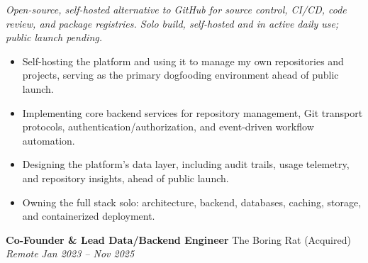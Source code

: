 \documentclass[10.5pt,letterpaper]{article}
\newcommand{\role}[4]{%
  \textbf{#1} \hfill #2 \\
  \textit{#3} \hfill \textit{#4}%
}
\begin{document}
\textit{Open-source, self-hosted alternative to GitHub for source control, CI/CD, code review, and package registries. Solo build, self-hosted and in active daily use; public launch pending.}
\begin{itemize}
  \item Self-hosting the platform and using it to manage my own repositories and projects, serving as the primary dogfooding environment ahead of public launch.
  \item Implementing core backend services for repository management, Git transport protocols, authentication/authorization, and event-driven workflow automation.
  \item Designing the platform's data layer, including audit trails, usage telemetry, and repository insights, ahead of public launch.
  \item Owning the full stack solo: architecture, backend, databases, caching, storage, and containerized deployment.
\end{itemize}
\vspace{2pt}
\role{Co-Founder \& Lead Data/Backend Engineer}{The Boring Rat (Acquired)}{Remote}{Jan 2023 -- Nov 2025}
\end{document}
